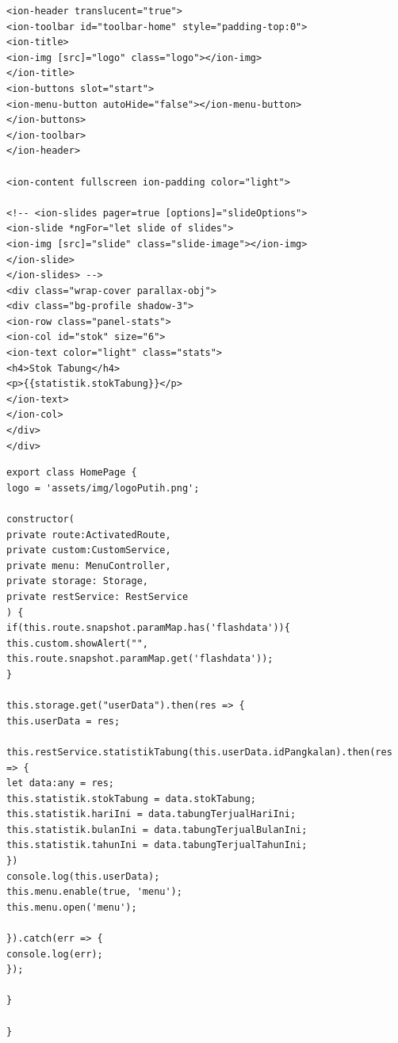 \begin{lstlisting}[caption=Potongan kode \textit{view} aplikasi berbasis android, label=viewMobile]
<ion-header translucent="true">
<ion-toolbar id="toolbar-home" style="padding-top:0">
<ion-title>
<ion-img [src]="logo" class="logo"></ion-img>
</ion-title>
<ion-buttons slot="start">
<ion-menu-button autoHide="false"></ion-menu-button>
</ion-buttons>
</ion-toolbar>
</ion-header>

<ion-content fullscreen ion-padding color="light">

<!-- <ion-slides pager=true [options]="slideOptions"> 
<ion-slide *ngFor="let slide of slides">
<ion-img [src]="slide" class="slide-image"></ion-img>
</ion-slide> 
</ion-slides> -->
<div class="wrap-cover parallax-obj">
<div class="bg-profile shadow-3">
<ion-row class="panel-stats">
<ion-col id="stok" size="6">
<ion-text color="light" class="stats">
<h4>Stok Tabung</h4>
<p>{{statistik.stokTabung}}</p>
</ion-text> 
</ion-col>
</div>
</div>

\end{lstlisting}

\begin{lstlisting}[caption=Potongan kode \textit{controller} aplikasi berbasis android, label=controllerMobile]
export class HomePage {
logo = 'assets/img/logoPutih.png';

constructor(
private route:ActivatedRoute,
private custom:CustomService,
private menu: MenuController,
private storage: Storage,
private restService: RestService
) {
if(this.route.snapshot.paramMap.has('flashdata')){
this.custom.showAlert("", this.route.snapshot.paramMap.get('flashdata'));
}

this.storage.get("userData").then(res => {
this.userData = res;

this.restService.statistikTabung(this.userData.idPangkalan).then(res => {
let data:any = res;
this.statistik.stokTabung = data.stokTabung;
this.statistik.hariIni = data.tabungTerjualHariIni;
this.statistik.bulanIni = data.tabungTerjualBulanIni;
this.statistik.tahunIni = data.tabungTerjualTahunIni;
})
console.log(this.userData);
this.menu.enable(true, 'menu');
this.menu.open('menu');

}).catch(err => {
console.log(err);
});

}

}

\end{lstlisting}


